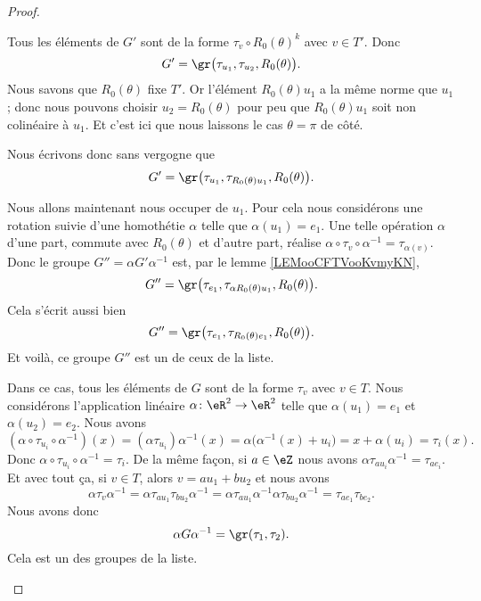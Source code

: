 \begin{proof}
\begin{subproof}
		Tous les éléments de \( G'\) sont de la forme \( \tau_v\circ R_0(\theta)^k\) avec \( v\in T'\). Donc
		\begin{equation}        \label{EQooUUDQooQpRcIi}
			G'=\gr\big(\tau_{u_1}, \tau_{u_2}, R_0(\theta)\big).
		\end{equation}
		Nous savons que \( R_0(\theta)\) fixe \( T'\). Or l'élément \( R_0(\theta)u_1\) a la même norme que \( u_1\); donc nous pouvons choisir \( u_2=R_0(\theta)\) pour peu que \( R_0(\theta)u_1\) soit non colinéaire à \( u_1\). Et c'est ici que nous laissons le cas \( \theta=\pi\) de côté.

		Nous écrivons donc sans vergogne que
		\begin{equation}
			G'=\gr\big(\tau_{u_1}, \tau_{R_0(\theta)u_1}, R_0(\theta)\big).
		\end{equation}

		Nous allons maintenant nous occuper de \( u_1\). Pour cela nous considérons une rotation suivie d'une homothétie \( \alpha\) telle que \( \alpha(u_1)=e_1\). Une telle opération \( \alpha\) d'une part, commute avec \( R_0(\theta)\) et d'autre part, réalise \( \alpha\circ \tau_v\circ\alpha^{-1}=\tau_{\alpha(v)}\). Donc le groupe \( G''=\alpha G'\alpha^{-1}\) est, par le lemme \ref{LEMooCFTVooKvmyKN},
		\begin{equation}
			G''=\gr\big( \tau_{e_1}, \tau_{\alpha R_0(\theta)u_1}, R_0(\theta) \big).
		\end{equation}
		Cela s'écrit aussi bien
		\begin{equation}
			G''=\gr\big( \tau_{e_1}, \tau_{R_0(\theta)e_1}, R_0(\theta) \big).
		\end{equation}
		Et voilà, ce groupe \( G''\) est un de ceux de la liste.

		\spitem[Le cas \( L=\{ \id \}\)]
		Dans ce cas, tous les éléments de \( G\) sont de la forme \( \tau_v\) avec \( v\in T\). Nous considérons l'application linéaire \( \alpha\colon \eR^2\to \eR^2\) telle que \( \alpha(u_1)=e_1\) et \( \alpha(u_2)=e_2\). Nous avons
		\begin{equation}
			(\alpha\circ \tau_{u_i}\circ \alpha^{-1})(x)=(\alpha\tau_{u_i})\alpha^{-1}(x)=\alpha\big( \alpha^{-1}(x)+u_i \big)=x+\alpha(u_i)=\tau_i(x).
		\end{equation}
		Donc \( \alpha\circ \tau_{u_i}\circ \alpha^{-1}=\tau_i\). De la même façon, si \( a\in \eZ\) nous avons \( \alpha\tau_{au_i}\alpha^{-1}=\tau_{ae_i}\). Et avec tout ça, si \( v\in T\), alors \( v=au_1+bu_2\) et nous avons
		\begin{equation}
			\alpha\tau_v\alpha^{-1}=\alpha\tau_{au_1}\tau_{bu_2}\alpha^{-1}=\alpha\tau_{au_1}\alpha^{-1}\alpha\tau_{bu_2}\alpha^{-1}=\tau_{ae_1}\tau_{be_2}.
		\end{equation}
		Nous avons donc
		\begin{equation}
			\alpha G\alpha^{-1}=\gr(\tau_1,\tau_2).
		\end{equation}
		Cela est un des groupes de la liste.


\end{subproof}
\end{proof}
